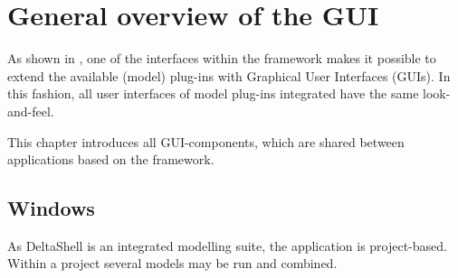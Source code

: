 
\chapter{General overview of the GUI}
\label{chap:ds_overview}

As shown in , one of the interfaces within the framework makes it possible to extend the available (model) plug-ins with Graphical User Interfaces (GUIs). In this fashion, all user interfaces of model plug-ins integrated have the same look-and-feel.

This chapter introduces all GUI-components, which are shared between applications based on the framework.
%
\section{Windows}
\label{sec:windows}
As DeltaShell is an integrated modelling suite, the application is project-based. Within a project several models may be run and combined.

